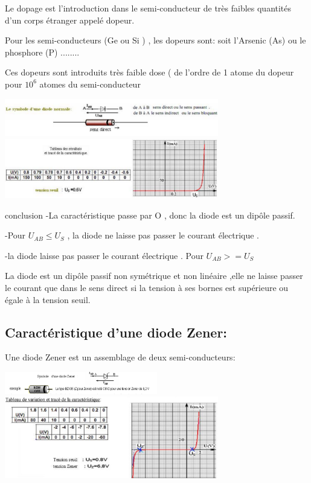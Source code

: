 \documentclass[12pt]{article}
\begin{document}
Le dopage est l'introduction dans le semi-conducteur de très faibles quantités d'un corps étranger appelé dopeur.

Pour les semi-conducteurs (Ge ou Si ) , les dopeurs sont: soit l'Arsenic (As) ou le phosphore (P) ........

Ces dopeurs sont introduits très faible dose ( de l'ordre de 1 atome du dopeur pour $10^6$ atomes du semi-conducteur


\begin{center}
  \includegraphics[width=0.7\textwidth]{./img/Diode_E.png}
\includegraphics[width=0.7\textwidth]{./img/carca_diode_e.png}

\end{center}

\begin{tcolorbox}{conclusion}
-La caractéristique passe par O , donc la diode est un dipôle passif.

  -Pour $U_{AB}\leq U_S$ , la diode ne laisse pas passer le courant électrique .

  -la diode laisse pas passer le courant électrique . Pour $U_{AB} >= U_S$

 La diode est un dipôle passif non symétrique et non linéaire ,elle ne laisse passer le courant que
dans le sens direct si la tension à ses bornes est supérieure ou égale à la tension seuil.
\end{tcolorbox}

\subsection{Caractéristique d'une diode Zener: }
Une diode Zener est un assemblage de deux semi-conducteurs:
\begin{center}
\includegraphics[width=0.5\textwidth]{./img/Ziner_diode.png}
\includegraphics[width=0.7\textwidth]{./img/Zener_carct.png}
\end{center}
\end{document}
